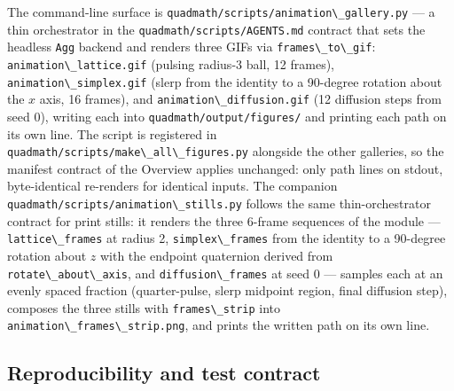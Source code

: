 \documentclass[
  10pt,
]{article}
\newcommand{\passthrough}[1]{#1}
\begin{document}
The command-line surface is
\passthrough{\lstinline!quadmath/scripts/animation\_gallery.py!} --- a
thin orchestrator in the
\passthrough{\lstinline!quadmath/scripts/AGENTS.md!} contract that sets
the headless \passthrough{\lstinline!Agg!} backend and renders three
GIFs via \passthrough{\lstinline!frames\_to\_gif!}:
\passthrough{\lstinline!animation\_lattice.gif!} (pulsing radius-3 ball,
12 frames), \passthrough{\lstinline!animation\_simplex.gif!} (slerp from
the identity to a 90-degree rotation about the \(x\) axis, 16 frames),
and \passthrough{\lstinline!animation\_diffusion.gif!} (12 diffusion
steps from seed 0), writing each into
\passthrough{\lstinline!quadmath/output/figures/!} and printing each
path on its own line. The script is registered in
\passthrough{\lstinline!quadmath/scripts/make\_all\_figures.py!}
alongside the other galleries, so the manifest contract of the Overview
applies unchanged: only path lines on stdout, byte-identical re-renders
for identical inputs. The companion
\passthrough{\lstinline!quadmath/scripts/animation\_stills.py!} follows
the same thin-orchestrator contract for print stills: it renders the
three 6-frame sequences of the module ---
\passthrough{\lstinline!lattice\_frames!} at radius 2,
\passthrough{\lstinline!simplex\_frames!} from the identity to a
90-degree rotation about \(z\) with the endpoint quaternion derived from
\passthrough{\lstinline!rotate\_about\_axis!}, and
\passthrough{\lstinline!diffusion\_frames!} at seed 0 --- samples each
at an evenly spaced fraction (quarter-pulse, slerp midpoint region,
final diffusion step), composes the three stills with
\passthrough{\lstinline!frames\_strip!} into
\passthrough{\lstinline!animation\_frames\_strip.png!}, and prints the
written path on its own line.

\subsection{Reproducibility and test
contract}\label{reproducibility-and-test-contract-1}
\end{document}
